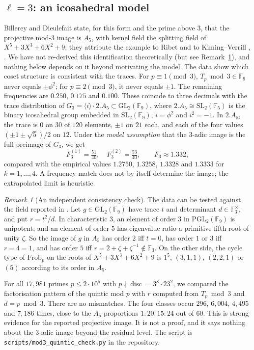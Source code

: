 \documentclass[11pt]{amsart}
\theoremstyle{definition}
\theoremstyle{remark}
\newtheorem{remark}[theorem]{Remark}
\newcommand{\F}{\mathbb{F}}
\newcommand{\GL}{\mathrm{GL}}
\newcommand{\SL}{\mathrm{SL}}
\newcommand{\Frob}{\mathrm{Frob}}
\begin{document}
\subsection{\texorpdfstring{$\ell=3$}{l=3}: an icosahedral model}
Billerey and Dieulefait state, for this form and the prime above $3$, that the projective mod-$3$ image is $A_5$, with kernel field the splitting field of $X^5+3X^3+6X^2+9$; they attribute the example to Ribet and to Kiming--Verrill \cite[\S5.3]{BD}, \cite[Ex.~3.2]{KV}. We have not re-derived this identification theoretically (but see Remark~\ref{rem:quintic}), and nothing below depends on it beyond motivating the model. The data show which coset structure is consistent with the traces. For $p\equiv1\pmod3$, $T_p\bmod3\in\F_9$ never equals $\pm\phi^2$; for $p\equiv2\pmod3$, it never equals $\pm1$. The remaining frequencies are $0.250$, $0.175$ and $0.100$. These coincide to three decimals with the trace distribution of $G_3=\langle i\rangle\cdot2.A_5\subset\GL_2(\F_9)$, where $2.A_5\cong\SL_2(\F_5)$ is the binary icosahedral group embedded in $\SL_2(\F_9)$, $i=\phi^2$ and $i^2=-1$. In $2.A_5$, the trace is $0$ on $30$ of $120$ elements, $\pm1$ on $21$ each, and each of the four values $(\pm1\pm\sqrt5)/2$ on $12$. Under the \emph{model assumption} that the $3$-adic image is the full preimage of $G_3$, we get
\[
F_3^{(1)}=\tfrac{51}{40},\quad F_3^{(2)}=\tfrac{53}{40},\qquad F_3\approx1.332,
\]
compared with the empirical values $1.2750$, $1.3258$, $1.3328$ and $1.3333$ for $k=1,\dots,4$. A frequency match does not by itself determine the image; the extrapolated limit is heuristic.

\begin{remark}[An independent consistency check]\label{rem:quintic}
The data can be tested against the field reported in \cite[\S5.3]{BD}. Let $g\in\GL_2(\F_9)$ have trace $t$ and determinant $d\in\F_3^\times$, and put $r=t^2/d$. In characteristic $3$, an element of order $3$ in $\mathrm{PGL}_2(\F_9)$ is unipotent, and an element of order $5$ has eigenvalue ratio a primitive fifth root of unity $\zeta$. So the image of $g$ in $A_5$ has order $2$ iff $t=0$, has order $1$ or $3$ iff $r=4=1$, and has order $5$ iff $r=2+\zeta+\zeta^{-1}\notin\F_3$. On the other side, the cycle type of $\Frob_p$ on the roots of $X^5+3X^3+6X^2+9$ is $1^5$, $(3,1,1)$, $(2,2,1)$ or $(5)$ according to its order in $A_5$.

For all $17{,}981$ primes $p\le2\cdot10^5$ with $p\nmid\operatorname{disc}=3^8\cdot23^2$, we compared the factorisation pattern of the quintic mod $p$ with $r$ computed from $T_p\bmod3$ and $d=p\bmod3$. There are no mismatches. The four classes occur $296$, $6{,}004$, $4{,}495$ and $7{,}186$ times, close to the $A_5$ proportions $1:20:15:24$ out of $60$. This is strong evidence for the reported projective image. It is not a proof, and it says nothing about the $3$-adic image beyond the residual level. The script is \texttt{scripts/mod3\_quintic\_check.py} in the repository.
\end{remark}
\end{document}
